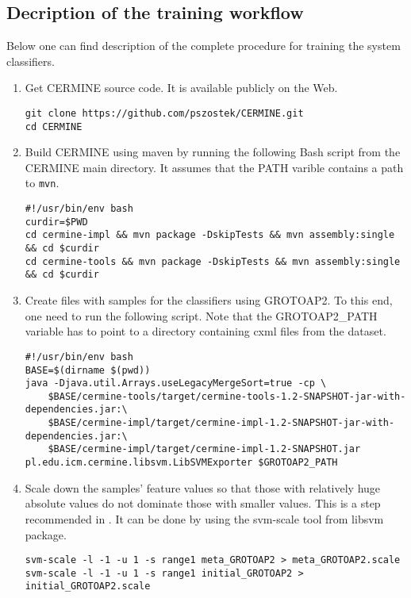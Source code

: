 \begin{appendices}
\noappendicestocpagenum
\addappheadtotoc
\chapter{Decription of the training workflow}
Below one can find description of the complete procedure for training the system classifiers.
\begin{enumerate}
\item Get CERMINE source code. It is available publicly on the Web.
\lstset{language=bash}
\begin{lstlisting}
git clone https://github.com/pszostek/CERMINE.git
cd CERMINE
\end{lstlisting}
\item Build CERMINE using maven by running the following Bash script from the CERMINE main directory. It assumes that the PATH varible contains a path to \verb+mvn+.
\begin{lstlisting}
#!/usr/bin/env bash
curdir=$PWD
cd cermine-impl && mvn package -DskipTests && mvn assembly:single && cd $curdir
cd cermine-tools && mvn package -DskipTests && mvn assembly:single && cd $curdir
\end{lstlisting}
\item Create files with samples for the classifiers using GROTOAP2. To this end, one need to run the following script. Note that the GROTOAP2\_PATH variable has to point to a directory containing cxml files from the dataset.
\begin{lstlisting}
#!/usr/bin/env bash
BASE=$(dirname $(pwd))
java -Djava.util.Arrays.useLegacyMergeSort=true -cp \
    $BASE/cermine-tools/target/cermine-tools-1.2-SNAPSHOT-jar-with-dependencies.jar:\
    $BASE/cermine-impl/target/cermine-impl-1.2-SNAPSHOT-jar-with-dependencies.jar:\
    $BASE/cermine-impl/target/cermine-impl-1.2-SNAPSHOT.jar pl.edu.icm.cermine.libsvm.LibSVMExporter $GROTOAP2_PATH
\end{lstlisting}
\item Scale down the samples' feature values so that those with relatively huge absolute values do not dominate those with smaller values. This is a step recommended in \cite{Chih-WeiHsu2010}. It can be done by using the svm-scale tool from libsvm package.
\begin{lstlisting}
svm-scale -l -1 -u 1 -s range1 meta_GROTOAP2 > meta_GROTOAP2.scale
svm-scale -l -1 -u 1 -s range1 initial_GROTOAP2 > initial_GROTOAP2.scale
\end{lstlisting}

\end{enumerate}
\end{appendices}
